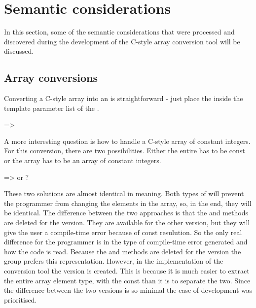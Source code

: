 
\section{Semantic considerations}

In this section, some of the semantic considerations that were processed and discovered during the development of the C-style array conversion tool will be discussed. 

\subsection{Array conversions} \label{subsec:095:030:array_conversions}

Converting a C-style  array into an  is straightforward - just place the  inside the template parameter list of the . 

 => 

A more interesting question is how to handle a C-style array of constant integers. For this conversion, there are two possibilities. Either the entire  has to be const or the array has to be an array of constant integers.

 =>  or ?

These two solutions are almost identical in meaning. Both types of  will prevent the programmer from changing the elements in the array, so, in the end, they will be identical. The difference between the two approaches is that the  and  methods are deleted for the  version. They are available for the other version, but they will give the user a compile-time error because of const resulution. So the only real difference for the programmer is in the type of compile-time error generated and how the code is read. Because the  and  methods are deleted for the  version the group prefers this representation. However, in the implementation of the conversion tool the  version is created. This is because it is much easier to extract the entire array element type, with the const than it is to separate the two. Since the difference between the two versions is so minimal the ease of development was prioritised.

